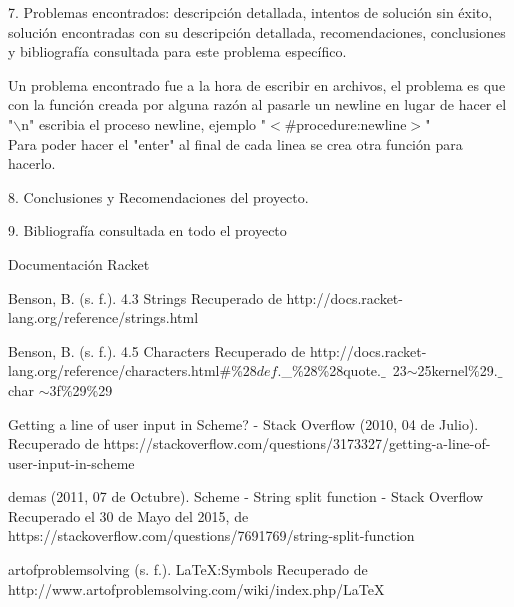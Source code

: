 \documentclass[12pt,a4paper]{report}
\begin{document}
\begin{flushleft}

7. Problemas encontrados: descripción detallada, intentos de solución sin éxito, solución encontradas con su descripción detallada, recomendaciones, conclusiones y bibliografía consultada para este problema específico.

Un problema encontrado fue a la hora de escribir en archivos, el problema es que con la función creada por alguna razón al pasarle un newline 
en lugar de hacer el "$\backslash$n" escribia el proceso newline, ejemplo "\(<\)$\#$procedure:newline\(>\)"\\
Para poder hacer el "enter" al final de cada linea se crea otra función para hacerlo.\\
 


\end{flushleft}

\begin{flushleft}

8. Conclusiones y Recomendaciones del proyecto.

\end{flushleft}

\begin{flushleft}

9. Bibliografía consultada en todo el proyecto




Documentación Racket

Benson, B. (s. f.). 4.3 Strings Recuperado de http://docs.racket-lang.org/reference/strings.html

Benson, B. (s. f.). 4.5 Characters Recuperado de http://docs.racket-lang.org/reference/characters.html$\#$\%$28def.$\_$\%28$\%28quote.$\_$~23$\sim$25kernel$\%$29.$\_$char
$\sim3$f$\%$29$\%$29

Getting a line of user input in Scheme? - Stack Overflow (2010, 04 de Julio). Recuperado de https://stackoverflow.com/questions/3173327/getting-a-line-of-user-input-in-scheme


demas (2011, 07 de Octubre). Scheme - String split function - Stack Overflow Recuperado el 30 de Mayo del 2015, de https://stackoverflow.com/questions/7691769/string-split-function


artofproblemsolving (s. f.). LaTeX:Symbols Recuperado de http://www.artofproblemsolving.com/wiki/index.php/LaTeX%








\end{flushleft}
\end{document}
